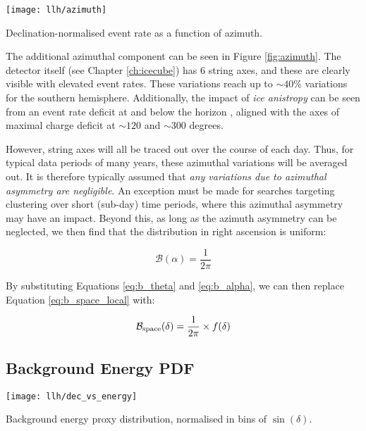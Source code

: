 \begin{marginfigure}
	\centering \texttt{[image: llh/azimuth]}
	\caption{Declination-normalised event rate as a function of azimuth.}
	\label{fig:azimuth}
\end{marginfigure}

The additional azimuthal component can be seen in Figure \ref{fig:azimuth}. The detector itself (see Chapter \ref{ch:icecube}) has 6 string axes, and these are clearly visible with elevated event rates. These variations reach up to $\sim40\%$ variations for the southern hemisphere. Additionally, the impact of \emph{ice anistropy} can be seen from an event rate deficit at and below the horizon , aligned with the axes of maximal charge deficit at $\sim 120$ and $\sim 300$ degrees. 

However, string axes will all be traced out over the course of each day. Thus, for typical data periods of many years, these azimuthal variations will be averaged out. It is therefore typically assumed that \emph{any variations due to azimuthal asymmetry are negligible}.  An exception must be made for searches targeting clustering over short (sub-day) time periods, where this azimuthal asymmetry may have an impact. Beyond this, as long as the azimuth asymmetry can be neglected, we then find that the distribution in right ascension is uniform:

\begin{equation}
	\mathcal{B} (\alpha) = \frac{1}{2\pi}
	\label{eq:b_alpha}
\end{equation}

By substituting Equations \ref{eq:b_theta} and \ref{eq:b_alpha}, we can then replace Equation \ref{eq:b_space_local} with:

\begin{equation}
	\mathcal{B}_{\textup{space}} (\delta) = \frac{1}{2\pi} \times f(\delta)
	\label{eq:b_space}
\end{equation}

\subsection*{Background Energy PDF}

\begin{marginfigure}
	\centering \texttt{[image: llh/dec\_vs\_energy]}
	\caption{Background energy proxy distribution, normalised in bins of $\sin(\delta)$.}
	\label{fig:dec_vs_energy}
\end{marginfigure}

